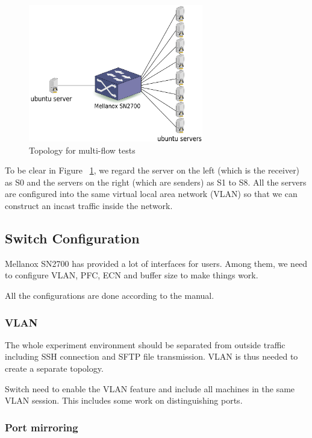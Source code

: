 \documentclass[12pt,a4paper]{article}
\begin{document}
\begin{figure}[ht]
	\begin{center}
		\includegraphics[width=3in]{Topology}
		\caption{Topology for multi-flow tests}
		\label{fig:Topology}
	\end{center}
\end{figure}

To be clear in Figure ~\ref{fig:Topology},
we regard the server on the left (which is the receiver) as S0 and the servers on the right (which are senders) as S1 to S8.
All the servers are configured into the same virtual local area network (VLAN) so that we can construct an incast traffic inside the network.

\subsection{Switch Configuration}

Mellanox SN2700 has provided a lot of interfaces for users.
Among them, we need to configure VLAN, PFC, ECN and buffer size to make things work.

All the configurations are done according to the manual.

\subsubsection{VLAN}
The whole experiment environment should be separated from outside traffic including SSH connection and SFTP file transmission.
VLAN is thus needed to create a separate topology.

Switch need to enable the VLAN feature and include all machines in the same VLAN session.
This includes some work on distinguishing ports.

\subsubsection{Port mirroring}
\end{document}
